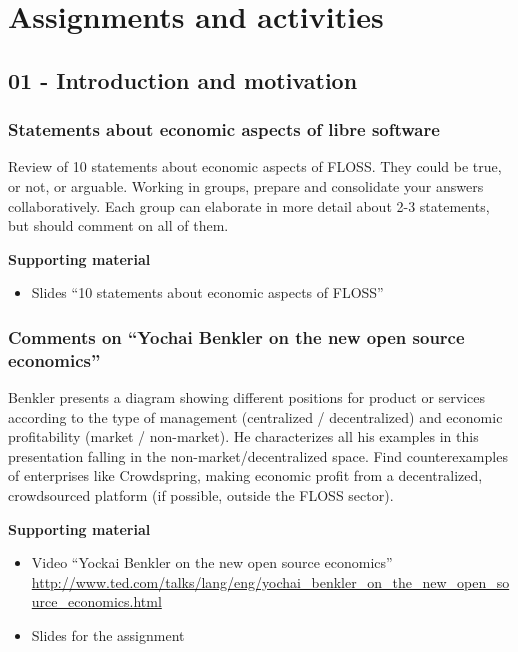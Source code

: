 \documentclass[a4paper]{article}
\begin{document}
\section{Assignments and activities}

\subsection{01 - Introduction and motivation}


\subsubsection{Statements about economic aspects of libre software}
\label{sub:statements-eco}

Review of 10 statements about economic aspects of FLOSS. They could be true, or not, or arguable. Working in groups, prepare and consolidate your answers collaboratively. Each group can elaborate in more detail about 2-3 statements, but should comment on all of them.

\textbf{Supporting material}

\begin{itemize}
\item Slides ``10 statements about economic aspects of FLOSS''
\end{itemize}

\subsubsection{Comments on ``Yochai Benkler on the new open source economics''}
\label{sub:comments-benkler}

Benkler presents a diagram showing different positions for product or services according to the type of management (centralized / decentralized) and economic profitability (market / non-market). He characterizes all his examples in this presentation falling in the non-market/decentralized space. Find counterexamples of enterprises like Crowdspring, making economic profit from a decentralized, crowdsourced platform (if possible, outside the FLOSS sector).

\textbf{Supporting material}

\begin{itemize}
\item Video ``Yockai Benkler on the new open source economics'' \\
  \url{http://www.ted.com/talks/lang/eng/yochai_benkler_on_the_new_open_source_economics.html}
\item Slides for the assignment 
\end{itemize}
\end{document}
